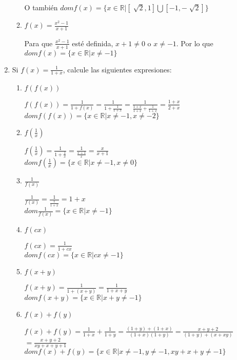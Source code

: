 \documentclass[11pt, a4paper]{article}
\begin{document}
\begin{enumerate}
\begin{enumerate}
            O también $dom f(x)= \{x \in \mathbb{R} | [\sqrt[]{2}, 1] \bigcup [-1, -\sqrt[]{2}]\}$

            \item $f(x)=\frac{x^2-1}{x+1}$
            
            Para que $\frac{x^2-1}{x+1}$ esté definida, $x+1 \neq 0$ o $x \neq -1$. Por lo que
            $dom f(x)= \{x \in \mathbb{R} | x \neq -1 \} $
        \end{enumerate}
    \item Si $f(x)= \frac{1}{1+x}$, calcule las siguientes expresiones:
        \begin{enumerate}
            \item $f(f(x))$
            
            $f(f(x)) = \frac{1}{1+f(x)}=\frac{1}{1+\frac{1}{1+x}}=\frac{1}{\frac{1+x}{1+x}+\frac{1}{1+x}}=\frac{1+x}{2+x}$\\
            $dom f(f(x))= \{x \in \mathbb{R} | x\neq -1,x\neq -2\}$

            \item $f(\frac{1}{x})$
            
            $f(\frac{1}{x})= \frac{1}{1+\frac{1}{x}}=\frac{1}{\frac{x+1}{x}}=\frac{x}{x+1}$\\
            $dom f(\frac{1}{x})= \{x\in \mathbb{R}| x \neq -1, x \neq 0\}$

            \item $\frac{1}{f(x)}$
            
            $\frac{1}{f(x)}=\frac{1}{\frac{1}{1+x}}=1+x$\\
            $dom \frac{1}{f(x)}= \{x \in \mathbb{R}| x \neq -1\}$

            \item $f(cx)$
            
            $f(cx)= \frac{1}{1+cx}$\\
            $dom f(cx)= \{x \in \mathbb{R}| cx \neq -1\}$

            \item $f(x+y)$
            
            $f(x+y)= \frac{1}{1+(x+y)}= \frac{1}{1+x+y}$\\
            $dom f(x+y)= \{x \in \mathbb{R}| x+y\neq -1\}$

            \item $f(x) + f(y)$
            
            $f(x)+f(y)=\frac{1}{1+x} + \frac{1}{1+y}=\frac{(1+y)+(1+x)}{(1+x)(1+y)}=\frac{x+y+2}{(1+y)+(x+xy)}$\\
            $=\frac{x+y+2}{xy + x + y + 1}$
            $dom f(x)+f(y)= \{x \in \mathbb{R}| x \neq -1, y \neq -1, xy + x + y \neq -1\}$

        \end{enumerate}
    \end{enumerate}
\end{document}
